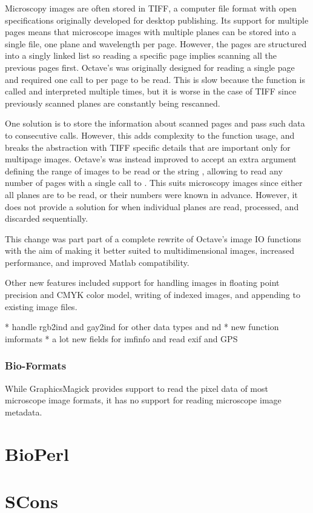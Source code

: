 Microscopy images are often stored in TIFF, a computer file format
with open specifications originally developed for desktop publishing.
Its support for multiple pages means that microscope images with
multiple planes can be stored into a single file, one plane and
wavelength per page.  However, the pages are structured into a singly
linked list so reading a specific page implies scanning all the
previous pages first.  Octave's  was originally
designed for reading a single page and required one call to
 per page to be read.  This is slow because the
function is called and interpreted multiple times, but it is worse in
the case of TIFF since previously scanned planes are constantly being
rescanned.

One solution is to store the information about scanned pages and pass
such data to consecutive  calls.  However, this adds
complexity to the function usage, and breaks the abstraction with TIFF
specific details that are important only for multipage images.
Octave's  was instead improved to accept an extra
argument defining the range of images to be read or the string
, allowing to read any number of pages with a single call
to .  This suits microscopy images since either all
planes are to be read, or their numbers were known in advance.
However, it does not provide a solution for when individual planes are
read, processed, and discarded sequentially.

This change was part part of a complete rewrite of Octave's image IO
functions with the aim of making it better suited to multidimensional
images, increased performance, and improved Matlab compatibility.

Other new features included support for handling images in floating
point precision and CMYK color model, writing of indexed images, and
appending to existing image files.


* handle rgb2ind and gay2ind for other data types and nd
* new function imformats
* a lot new fields for imfinfo and read exif and GPS



\subsubsection{Bio-Formats}

While GraphicsMagick provides support to read the pixel data of most
microscope image formats, it has no support for reading microscope
image metadata.


\section{BioPerl}

\section{SCons}
